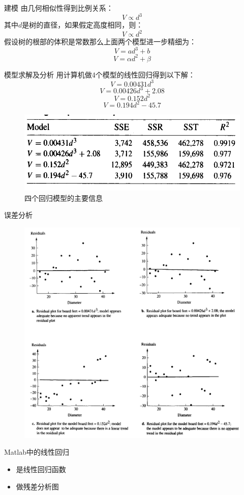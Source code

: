 \documentclass[UTF8]{ctexbeamer}
\begin{document}
\begin{frame}{建模}
    由几何相似性得到比例关系： 
    \[
    V \propto d^3
    \]
    其中$d$是树的直径，如果假定高度相同，则：
    \[
    V \propto d^2
    \]
    假设树的根部的体积是常数那么上面两个模型进一步精细为：
    \[
    V = ad^3+b
    \]
    \[
    V = \alpha d^2 + \beta
    \]
\end{frame}

\begin{frame}{模型求解及分析}
  用计算机做4个模型的线性回归得到以下解：
    \[
    V = 0.00431d^3
    \]
    \[
    V = 0.00426d^3 + 2.08
    \]
    \[
    V = 0.152d^2
    \]
    \[
    V = 0.194d^2 - 45.7
    \]

    \begin{figure}
      \centering
      \includegraphics[width=.6\textwidth{}]{pine-regress.png}
      \caption{四个回归模型的主要信息}
    \end{figure}
  
\end{frame}

\begin{frame}{误差分析}

  \begin{figure}
    \centering
    \includegraphics[height=.7\textheight{}]{pine-error.png}
  \end{figure}
  
\end{frame}

\begin{frame}{Matlab中的线性回归}
  \begin{itemize}
  \item {}是线性回归函数
  \item {}做残差分析图
  \end{itemize}
\end{frame}
\end{document}
